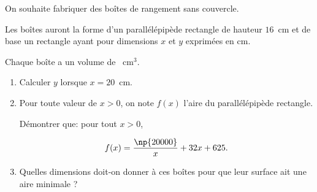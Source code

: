 \medskip

On souhaite fabriquer des boîtes de rangement sans couvercle.

Les boîtes auront la forme d'un parallélépipède rectangle de hauteur $16$~cm et de base un rectangle ayant pour dimensions $x$ et $y$ exprimées en cm. 

Chaque boîte a un volume de ~cm$^3$.

\medskip

\begin{enumerate}
\item Calculer $y$ lorsque $x = 20$~cm.
\item  Pour toute valeur de $x > 0$, on note $f(x)$ l'aire du parallélépipède rectangle.

Démontrer que: pour tout $x > 0$,

\[f(x) = \dfrac{\np{20000}}{x} +32x +625.\]

\item  Quelles dimensions doit-on donner à ces boîtes pour que leur surface ait une aire minimale ?
\end{enumerate}
